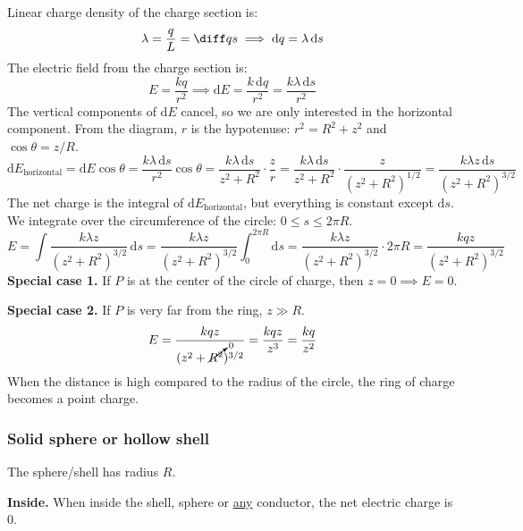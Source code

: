 \documentclass{article}
\begin{document}
Linear charge density of the charge section is:
\begin{equation*}
    \lambda=\frac qL=\diff qs
	\implies \mathrm{d}q=\lambda \,\mathrm{d}s
\end{equation*}
The electric field from the charge section is:
\begin{equation*}
	E=\frac{kq}{r^2}
	\implies
    \mathrm{d}E
	=\frac{k \,\mathrm{d}q}{r^2}
	=\frac{k\lambda \,\mathrm{d}s}{r^2}
\end{equation*}
The vertical components of $\mathrm{d}E$ cancel, so we are only interested in the horizontal component. From the diagram, $r$ is the hypotenuse: $r^2=R^2+z^2$ and $\cos\theta=z/R$.
\begin{equation*}
	\mathrm{d}E_\text{horizontal}
	=\mathrm{d}E\cos\theta
	=\frac{k\lambda \,\mathrm{d}s}{r^2}\cos\theta
	=\frac{k\lambda \,\mathrm{d}s}{z^2+R^2}\cdot \frac{z}{r}
	=\frac{k\lambda \,\mathrm{d}s}{z^2+R^2}\cdot \frac{z}{(z^2+R^2)^{1/2}}
	=\frac{k\lambda z \,\mathrm{d}s}{(z^2+R^2)^{3/2}}
\end{equation*}
The net charge is the integral of $\mathrm{d}E_\text{horizontal}$, but everything is constant except $\mathrm{d}s$. We integrate over the circumference of the circle: $0\leq s\leq 2\pi R$.
\begin{equation*}
    E
	=\int \frac{k\lambda z}{(z^2+R^2)^{3/2}}\,\mathrm{d}s
	=\frac{k\lambda z}{(z^2+R^2)^{3/2}}\int_0^{2\pi R} \mathrm{d}s
	=\frac{k\lambda z}{(z^2+R^2)^{3/2}}\cdot2\pi R
	=\boxed{\frac{kqz}{(z^2+R^2)^{3/2}}}
\end{equation*}
\textbf{Special case 1.} If $P$ is at the center of the circle of charge, then $z=0\implies E=0$.

\textbf{Special case 2.} If $P$ is very far from the ring, $z\gg R$.
\begin{equation*}
	E
	=\frac{kqz}{(z^2+\cancelto0{R^2})^{3/2}}
	=\frac{kqz}{z^3}
	=\frac{kq}{z^2}
\end{equation*}
When the distance is high compared to the radius of the circle, the ring of charge becomes a point charge.

\subsubsection{Solid sphere or hollow shell}

The sphere/shell has radius $R$.

\textbf{Inside.} When inside the shell, sphere or \ul{any} conductor, the net electric charge is $0$.
\end{document}
